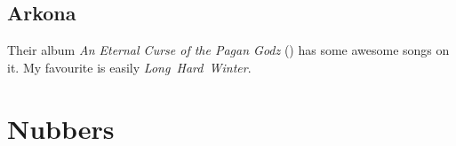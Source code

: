\documentclass[onecolumn]{article}
\begin{document}
\subsection*{Arkona}
Their album \emph{An Eternal Curse of the Pagan Godz} (\citeyear{nub}) has some awesome songs on it. My favourite is easily \mbox{\emph{Long Hard Winter}}.


\clearpage{}
\section*{\centering Nubbers}


\printbibliography
\end{document}
